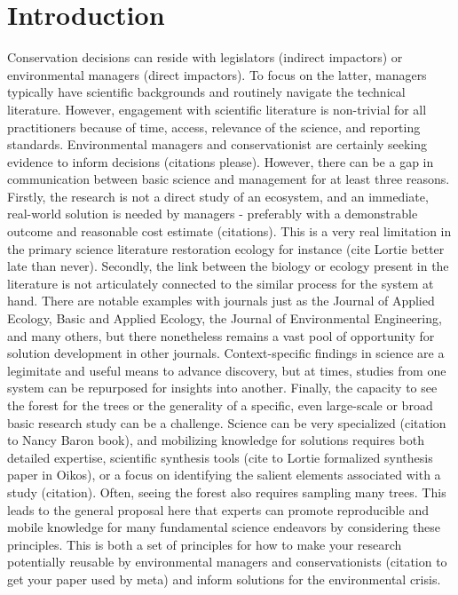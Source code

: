 \documentclass[10pt,letterpaper]{article}
\begin{document}
\linenumbers

\section{Introduction}\label{introduction}

Conservation decisions can reside with legislators (indirect impactors)
or environmental managers (direct impactors). To focus on the latter,
managers typically have scientific backgrounds and routinely navigate
the technical literature. However, engagement with scientific literature
is non-trivial for all practitioners because of time, access, relevance
of the science, and reporting standards. Environmental managers and
conservationist are certainly seeking evidence to inform decisions
(citations please). However, there can be a gap in communication between
basic science and management for at least three reasons. Firstly, the
research is not a direct study of an ecosystem, and an immediate,
real-world solution is needed by managers - preferably with a
demonstrable outcome and reasonable cost estimate (citations). This is a
very real limitation in the primary science literature restoration
ecology for instance (cite Lortie better late than never). Secondly, the
link between the biology or ecology present in the literature is not
articulately connected to the similar process for the system at hand.
There are notable examples with journals just as the Journal of Applied
Ecology, Basic and Applied Ecology, the Journal of Environmental
Engineering, and many others, but there nonetheless remains a vast pool
of opportunity for solution development in other journals.
Context-specific findings in science are a legimitate and useful means
to advance discovery, but at times, studies from one system can be
repurposed for insights into another. Finally, the capacity to see the
forest for the trees or the generality of a specific, even large-scale
or broad basic research study can be a challenge. Science can be very
specialized (citation to Nancy Baron book), and mobilizing knowledge for
solutions requires both detailed expertise, scientific synthesis tools
(cite to Lortie formalized synthesis paper in Oikos), or a focus on
identifying the salient elements associated with a study (citation).
Often, seeing the forest also requires sampling many trees. This leads
to the general proposal here that experts can promote reproducible and
mobile knowledge for many fundamental science endeavors by considering
these principles. This is both a set of principles for how to make your
research potentially reusable by environmental managers and
conservationists (citation to get your paper used by meta) and inform
solutions for the environmental crisis.
\end{document}
